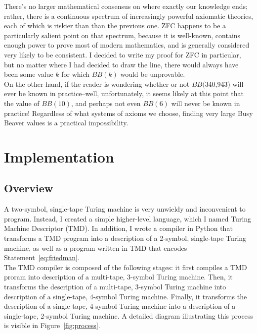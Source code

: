 \documentclass[11pt]{report}
\newcommand{\bbstatenum}{$BB($340,943) }
\begin{document}
There's no larger mathematical consensus on where exactly our knowledge ends; rather, there is a continuous spectrum of increasingly powerful axiomatic theories, each of which is riskier than than the previous one. ZFC happens to be a particularly salient point on that spectrum, because it is well-known, contains enough power to prove most of modern mathematics, and is generally considered very likely to be consistent. I decided to write my proof for ZFC in particular, but no matter where I had decided to draw the line, there would always have been some value $k$ for which $BB(k)$ would be unprovable. \\

On the other hand, if the reader is wondering whether or not \bbstatenum will ever be known in practice--well, unfortunately, it seems likely at this point that the value of $BB(10)$, and perhaps not even $BB(6)$ will never be known in practice! Regardless of what systems of axioms we choose, finding very large Busy Beaver values is a practical impossibility.~\cite{bbimpossible}

\chapter{Implementation \label{sec:implementation}}

\section{Overview}

A two-symbol, single-tape Turing machine is very unwieldy and inconvenient to program. Instead, I created a simple higher-level language, which I named Turing Machine Descriptor (TMD). In addition, I wrote a compiler in Python that transforms a TMD program into a description of a 2-symbol, single-tape Turing machine, as well as a program written in TMD that encodes Statement~\ref{eq:friedman}. \\
 
The TMD compiler is composed of the following stages: it first compiles a TMD proram into description of a multi-tape, 3-symbol Turing machine. Then, it transforms the description of a multi-tape, 3-symbol Turing machine into description of a single-tape, 4-symbol Turing machine. Finally, it transforms the description of a single-tape, 4-symbol Turing machine into a description of a single-tape, 2-symbol Turing machine. A detailed diagram illustrating this process is visible in Figure~\ref{fig:process}. \\
\end{document}
